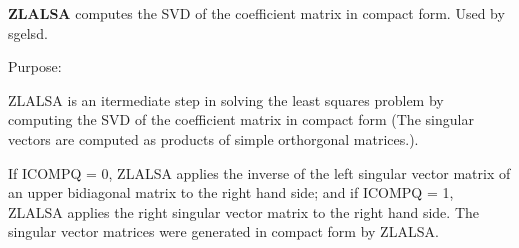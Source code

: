 {\bfseries Z\+L\+A\+L\+S\+A} computes the S\+V\+D of the coefficient matrix in compact form. Used by sgelsd. 

 \begin{DoxyParagraph}{Purpose\+: }
\begin{DoxyVerb} ZLALSA is an itermediate step in solving the least squares problem
 by computing the SVD of the coefficient matrix in compact form (The
 singular vectors are computed as products of simple orthorgonal
 matrices.).

 If ICOMPQ = 0, ZLALSA applies the inverse of the left singular vector
 matrix of an upper bidiagonal matrix to the right hand side; and if
 ICOMPQ = 1, ZLALSA applies the right singular vector matrix to the
 right hand side. The singular vector matrices were generated in
 compact form by ZLALSA.\end{DoxyVerb}
 
\end{DoxyParagraph}

